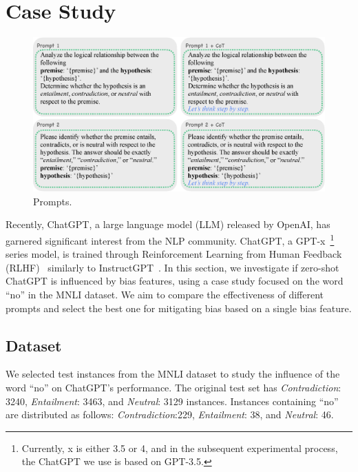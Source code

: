 \section{Case Study}
\label{sec:mitigatingbiases}
\begin{figure}[th]
\centering
\includegraphics[width=\columnwidth]{picture/prompt.eps}
\caption{Prompts. }
\label{fig:prompt}
\end{figure}

Recently, ChatGPT, a large language model (LLM) released by OpenAI, has garnered significant interest 
from the NLP community.
ChatGPT, a GPT-x~\footnote{Currently, x is either 3.5 or 4, and in the subsequent experimental process, the ChatGPT we use is based on GPT-3.5.} series model, 
is trained through Reinforcement Learning from Human Feedback (RLHF)~\cite{christiano2017deep} similarly to InstructGPT~\cite{ouyang2022training}.
In this section, we investigate if zero-shot ChatGPT is influenced by bias features, using a case study focused on the word ``no'' in the MNLI dataset.
We aim to compare the effectiveness of different prompts and select the best one for mitigating bias 
based on a single bias feature. 

\subsection{Dataset}
\label{sec:chatgptdata}
We selected test instances from the MNLI dataset 
to study the influence of the word ``no'' on ChatGPT's performance. 
The original test set has \textit{Contradiction}: 3240, 
\textit{Entailment}: 3463, and \textit{Neutral}: 3129 instances. 
Instances containing ``no'' are distributed as follows: \textit{Contradiction}:229, 
\textit{Entailment}: 38, and \textit{Neutral}: 46.


